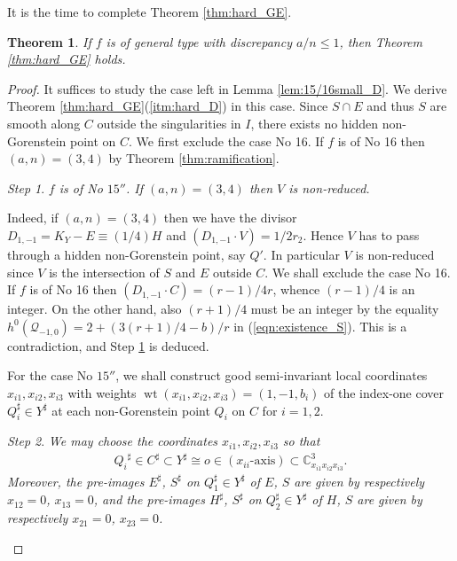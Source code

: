 \documentclass[a4paper,11pt]{amsart}
\newtheorem{theorem}{Theorem}[section]
\theoremstyle{definition}
\theoremstyle{remark}
\newtheorem{step}{Step}
\numberwithin{equation}{section}
\newcommand{\bC}{{\mathbb C}}
\newcommand{\cQ}{{\mathcal Q}}
\newcommand{\axis}{\textrm{-}\mathrm{axis}}
\newcommand{\wt}{\operatorname{wt}}
\begin{document}
It is the time to complete Theorem \ref{thm:hard_GE}.

\begin{theorem}\label{thm:15/16small}
If $f$ is of general type with discrepancy $a/n\le1$,
then Theorem \textup{\ref{thm:hard_GE}} holds.
\end{theorem}

\begin{proof}
It suffices to study the case left in Lemma \ref{lem:15/16small_D}.
We derive Theorem \ref{thm:hard_GE}(\ref{itm:hard_D}) in this case.
Since $S \cap E$ and thus $S$ are smooth along $C$
outside the singularities in $I$,
there exists no hidden non-Gorenstein point on $C$.
We first exclude the case No 16.
If $f$ is of No 16 then $(a,n)=(3,4)$ by Theorem \ref{thm:ramification}.

\begin{step}\label{stp:15/16small-1}
\itshape
$f$ is of No $\textrm{15}''$.
If $(a,n)=(3,4)$ then $V$ is non-reduced.
\end{step}

Indeed,
if $(a,n)=(3,4)$ then we have the divisor $D_{1,-1}=K_Y-E\equiv(1/4)H$
and $(D_{1,-1} \cdot V)=1/2r_2$.
Hence $V$ has to pass through a hidden non-Gorenstein point, say $Q'$.
In particular $V$ is non-reduced
since $V$ is the intersection of $S$ and $E$ outside $C$.
We shall exclude the case No 16.
If $f$ is of No 16 then $(D_{1,-1} \cdot C)=(r-1)/4r$,
whence $(r-1)/4$ is an integer.
On the other hand,
also $(r+1)/4$ must be an integer
by the equality $h^0(\cQ_{-1,0})=2+(3(r+1)/4-b)/r$ in (\ref{eqn:existence_S}).
This is a contradiction,
and Step \ref{stp:15/16small-1} is deduced.

For the case No $\textrm{15}''$,
we shall construct good semi-invariant local coordinates 
$x_{i1},x_{i2},x_{i3}$ with weights $\wt(x_{i1},x_{i2},x_{i3})=(1,-1,b_i)$
of the index-one cover $Q_i^\sharp \in Y^\sharp$
at each non-Gorenstein point $Q_i$ on $C$ for $i=1,2$.

\begin{step}\label{stp:15/16small-2}
\itshape
We may choose the coordinates $x_{i1},x_{i2},x_{i3}$ so that
\begin{align*}
{Q_i}^\sharp \in C^\sharp \subset Y^\sharp
\cong o \in (x_{ii}\axis) \subset \bC^3_{x_{i1}x_{i2}x_{i3}}.
\end{align*}
Moreover, 
the pre-images $E^\sharp$, $S^\sharp$ on $Q_1^\sharp \in Y^\sharp$
of $E$, $S$ are given by respectively $x_{12}=0$, $x_{13}=0$,
and the pre-images $H^\sharp$, $S^\sharp$ on $Q_2^\sharp \in Y^\sharp$
of $H$, $S$ are given by respectively $x_{21}=0$, $x_{23}=0$.
\end{step}


\end{proof}
\end{document}
